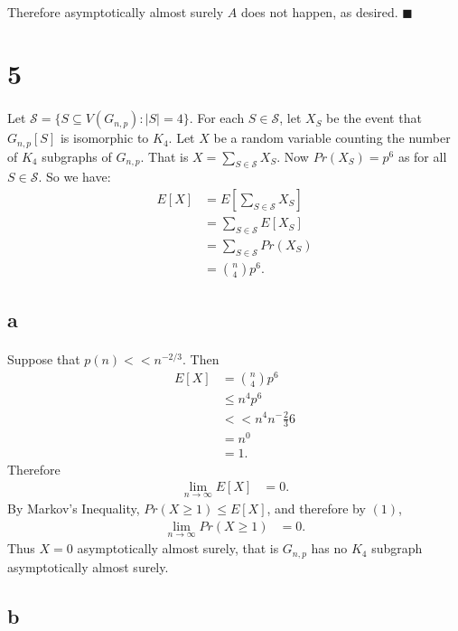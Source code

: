 \documentclass[letterpaper,12pt,oneside,onecolumn]{report}
\begin{document}
\paragraph{}
Therefore asymptotically almost surely $A$ does not happen, as desired. $\blacksquare$
\section*{5}
\paragraph{}
Let $\mathcal{S} = \{S \subseteq V(G_{n,p}) : |S| = 4\}$. For each $S \in \mathcal{S}$, let $X_S$ be the event that $G_{n,p}[S]$ is isomorphic to $K_4$. Let $X$ be a random variable counting the number of $K_4$ subgraphs of $G_{n,p}$. That is $X = \sum_{S \in \mathcal{S}} X_S$. Now $Pr(X_S) = p^6$ as for all $S \in \mathcal{S}$. So we have:
\begin{align*} 
E[X] &= E[\sum_{S \in \mathcal{S}} X_S] \\
&= \sum_{S \in \mathcal{S}} E[X_S] \\
&= \sum_{S \in \mathcal{S}} Pr(X_S) \\
&= {n \choose 4} p^6.
\end{align*}
\subsection*{a}
\paragraph{}
Suppose that $p(n) << n^{-2/3}$. Then 
\begin{align*}
E[X] &= {n \choose 4} p^6 \\
&\leq n^4 p^6 \\
&<< n^4 n^-\frac{2}{3}6 \\
&= n^0 \\
&= 1.
\end{align*}
Therefore 
\begin{align}
\lim_{n\to \infty}E[X] &= 0.
\end{align}
By Markov's Inequality, $Pr(X \geq 1) \leq E[X]$, and therefore by $(1)$, 
\begin{align*}
\lim_{n \to \infty}Pr(X \geq 1) &= 0.
\end{align*}
Thus $X = 0$ asymptotically almost surely, that is $G_{n,p}$ has no $K_4$ subgraph asymptotically almost surely.
\subsection*{b}
\end{document}
